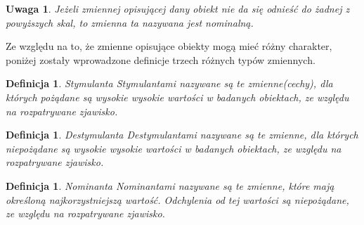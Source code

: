 \documentclass[12pt,a4paper]{report}
\newtheorem{definition}[theorem]{Definicja}
\newtheorem{uwaga}{Uwaga}
\begin{document}
\begin{itemize}

\end{itemize}

\begin{uwaga}
Jeżeli zmiennej opisującej dany obiekt nie da się odnieść do żadnej z powyższych skal, to zmienna ta nazywana jest nominalną.
\end{uwaga}

Ze względu na to, że zmienne opisujące obiekty mogą mieć różny charakter, poniżej zostały wprowadzone definicje trzech różnych typów zmiennych.

\begin{definition}{Stymulanta \cite[Rozdział 1.5]{panek2013}}
Stymulantami nazywane są te zmienne(cechy), dla których pożądane są wysokie wysokie wartości w badanych obiektach, ze względu na rozpatrywane zjawisko. 
\end{definition}

\begin{definition}{Destymulanta \cite[Rozdział 1.5]{panek2013}}
Destymulantami nazywane są te  zmienne, dla których niepożądane są wysokie wysokie wartości w badanych obiektach, ze względu na rozpatrywane zjawisko. 
\end{definition}

\begin{definition}{Nominanta \cite[Rozdział 1.5]{panek2013}}
Nominantami nazywane są te zmienne, które mają określoną najkorzystniejszą wartość. Odchylenia od tej wartości są niepożądane, ze względu na rozpatrywane zjawisko. 
\end{definition}



\end{document}
